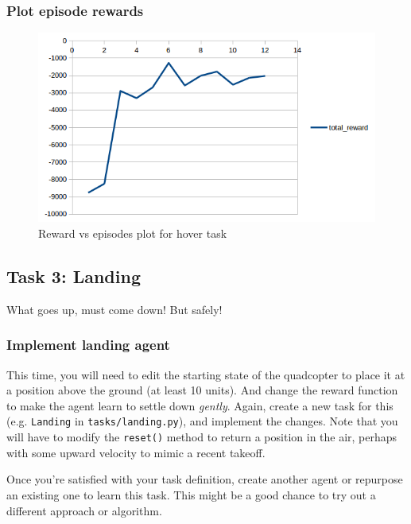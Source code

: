 \documentclass[11pt]{article}
\makeatletter
\def\maxwidth{\ifdim\Gin@nat@width>\linewidth\linewidth
    \else\Gin@nat@width\fi}
\let\Oldincludegraphics\includegraphics
\renewcommand{\includegraphics}[1]{\Oldincludegraphics[width=.8\maxwidth]{#1}}
\makeatother
\begin{document}
\hypertarget{plot-episode-rewards}{%
\subsubsection{Plot episode rewards}\label{plot-episode-rewards}}

\begin{figure}
\centering
\includegraphics{images/hover.png}
\caption{Reward vs episodes plot for hover task}
\end{figure}

    \hypertarget{task-3-landing}{%
\subsection{Task 3: Landing}\label{task-3-landing}}

What goes up, must come down! But safely!

\hypertarget{implement-landing-agent}{%
\subsubsection{Implement landing agent}\label{implement-landing-agent}}

This time, you will need to edit the starting state of the quadcopter to
place it at a position above the ground (at least 10 units). And change
the reward function to make the agent learn to settle down
\emph{gently}. Again, create a new task for this (e.g. \texttt{Landing}
in \texttt{tasks/landing.py}), and implement the changes. Note that you
will have to modify the \texttt{reset()} method to return a position in
the air, perhaps with some upward velocity to mimic a recent takeoff.

Once you're satisfied with your task definition, create another agent or
repurpose an existing one to learn this task. This might be a good
chance to try out a different approach or algorithm.
\end{document}
